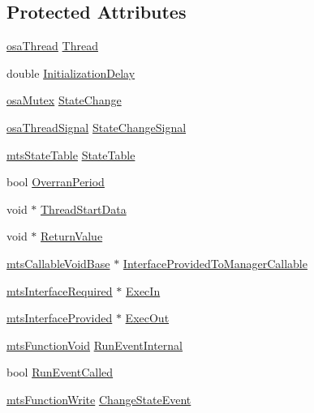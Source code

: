 \subsection*{Protected Attributes}
\begin{DoxyCompactItemize}
\item 
\hyperlink{classosa_thread}{osa\+Thread} \hyperlink{classmts_task_a020aaf3f85e33991c3b349138b826218}{Thread}
\item 
double \hyperlink{classmts_task_a019723804fb78a9c8a2146d921290570}{Initialization\+Delay}
\item 
\hyperlink{classosa_mutex}{osa\+Mutex} \hyperlink{classmts_task_abcc895b6d73ea813783da11440e2fe3a}{State\+Change}
\item 
\hyperlink{classosa_thread_signal}{osa\+Thread\+Signal} \hyperlink{classmts_task_a49ee515de5a8a49d2c307ed429ce390f}{State\+Change\+Signal}
\item 
\hyperlink{classmts_state_table}{mts\+State\+Table} \hyperlink{classmts_task_afef3935273a3dfe792b7d3beb6b3c4f1}{State\+Table}
\item 
bool \hyperlink{classmts_task_a974896a778a02b8928397213658b1c83}{Overran\+Period}
\item 
void $\ast$ \hyperlink{classmts_task_a0f4d0bdac8ce91bd7a44a80d0903165b}{Thread\+Start\+Data}
\item 
void $\ast$ \hyperlink{classmts_task_a78bef07d3d9f446ee5d83724ada03d7e}{Return\+Value}
\item 
\hyperlink{classmts_callable_void_base}{mts\+Callable\+Void\+Base} $\ast$ \hyperlink{classmts_task_a044e5d67f206af2df17d7406860d4ec4}{Interface\+Provided\+To\+Manager\+Callable}
\item 
\hyperlink{classmts_interface_required}{mts\+Interface\+Required} $\ast$ \hyperlink{classmts_task_af77b19432b3640be7680c03cd0f78c22}{Exec\+In}
\item 
\hyperlink{classmts_interface_provided}{mts\+Interface\+Provided} $\ast$ \hyperlink{classmts_task_a5a65f2162a178087dc90effe7a9ab6d8}{Exec\+Out}
\item 
\hyperlink{classmts_function_void}{mts\+Function\+Void} \hyperlink{classmts_task_a8c40d935488c3bdba29f88bef9ee7809}{Run\+Event\+Internal}
\item 
bool \hyperlink{classmts_task_a274a28efd0acb799f30a25ca6a729956}{Run\+Event\+Called}
\item 
\hyperlink{classmts_function_write}{mts\+Function\+Write} \hyperlink{classmts_task_ae7a10d8ab52bae5e6a5dc9589a7a386e}{Change\+State\+Event}
\end{DoxyCompactItemize}
